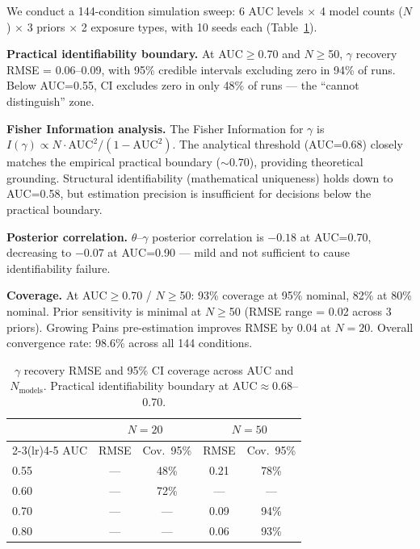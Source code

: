 \documentclass[letterpaper]{article}
\begin{document}
We conduct a 144-condition simulation sweep: 6 AUC levels $\times$ 4 model counts ($N$) $\times$ 3 priors $\times$ 2 exposure types, with 10 seeds each (Table~\ref{tab:identifiability}).

\textbf{Practical identifiability boundary.}
At AUC$\geq$0.70 and $N\geq$50, $\gamma$ recovery RMSE = 0.06--0.09, with 95\% credible intervals excluding zero in 94\% of runs.
Below AUC=0.55, CI excludes zero in only 48\% of runs --- the ``cannot distinguish'' zone.

\textbf{Fisher Information analysis.}
The Fisher Information for $\gamma$ is $I(\gamma) \propto N \cdot \text{AUC}^2 / (1-\text{AUC}^2)$.
The analytical threshold (AUC=0.68) closely matches the empirical practical boundary ($\sim$0.70), providing theoretical grounding.
Structural identifiability (mathematical uniqueness) holds down to AUC=0.58, but estimation precision is insufficient for decisions below the practical boundary.

\textbf{Posterior correlation.}
$\theta$--$\gamma$ posterior correlation is $-0.18$ at AUC=0.70, decreasing to $-0.07$ at AUC=0.90 --- mild and not sufficient to cause identifiability failure.

\textbf{Coverage.}
At AUC$\geq$0.70 / $N\geq$50: 93\% coverage at 95\% nominal, 82\% at 80\% nominal.
Prior sensitivity is minimal at $N\geq$50 (RMSE range = 0.02 across 3 priors).
Growing Pains pre-estimation improves RMSE by 0.04 at $N=20$.
Overall convergence rate: 98.6\% across all 144 conditions.

\begin{table}[t]
\centering
\caption{$\gamma$ recovery RMSE and 95\% CI coverage across AUC and $N_{\text{models}}$. Practical identifiability boundary at AUC$\approx$0.68--0.70.}
\label{tab:identifiability}
\begin{tabular}{lcccc}
\toprule
 & \multicolumn{2}{c}{$N=20$} & \multicolumn{2}{c}{$N=50$} \\
\cmidrule(lr){2-3}\cmidrule(lr){4-5}
AUC & RMSE & Cov.\ 95\% & RMSE & Cov.\ 95\% \\
\midrule
0.55 & --- & 48\% & 0.21 & 78\% \\
0.60 & --- & 72\% & --- & --- \\
0.70 & --- & --- & 0.09 & 94\% \\
0.80 & --- & --- & 0.06 & 93\% \\
\bottomrule
\end{tabular}
\vspace{-2mm}
\end{table}
\end{document}
